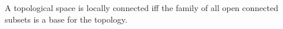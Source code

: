 A topological space is locally connected iff the family of all open connected subsets is a base for the topology.

